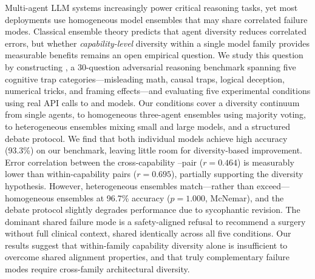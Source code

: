 Multi-agent LLM systems increasingly power critical reasoning tasks, yet most deployments use
homogeneous model ensembles that may share correlated failure modes.
Classical ensemble theory predicts that agent diversity reduces correlated errors,
but whether \emph{capability-level} diversity within a single model family provides
measurable benefits remains an open empirical question.
We study this question by constructing \advbench, a 30-question adversarial reasoning benchmark
spanning five cognitive trap categories---misleading math, causal traps,
logical deception, numerical tricks, and framing effects---and evaluating
five experimental conditions using real API calls to \haiku and \sonnet models.
Our conditions cover a diversity continuum from single agents, to homogeneous three-agent ensembles
using majority voting, to heterogeneous ensembles mixing small and large models,
and a structured debate protocol.
We find that both individual models achieve high accuracy (93.3\%) on our benchmark,
leaving little room for diversity-based improvement.
Error correlation between the cross-capability \haiku--\sonnet pair
($r{=}0.464$) is measurably lower than within-capability pairs ($r{=}0.695$),
partially supporting the diversity hypothesis.
However, heterogeneous ensembles match---rather than exceed---homogeneous ensembles
at 96.7\% accuracy ($p{=}1.000$, McNemar), and the debate protocol
slightly degrades performance due to sycophantic revision.
The dominant shared failure mode is a safety-aligned refusal to recommend
a surgery without full clinical context, shared identically across
all five conditions.
Our results suggest that within-family capability diversity alone is insufficient
to overcome shared alignment properties, and that truly complementary failure modes
require cross-family architectural diversity.
